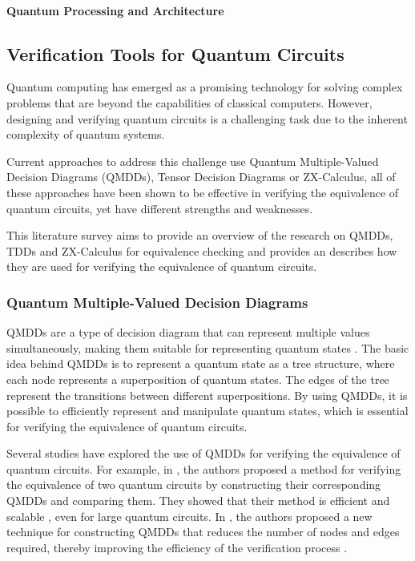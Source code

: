 \documentclass[11pt]{article}
\theoremstyle{definition}
\theoremstyle{definition}
\begin{document}
\paragraph{Quantum Processing and Architecture}
\label{sec:org3408efc}

\subsection{Verification Tools for Quantum Circuits}
\label{sec:orga91866d}
Quantum computing has emerged as a promising technology for solving complex
problems that are beyond the capabilities of classical computers. However,
designing and verifying quantum circuits is a challenging task due to the
inherent complexity of quantum systems. 

Current approaches to address this challenge use Quantum Multiple-Valued
Decision Diagrams (QMDDs), Tensor Decision Diagrams or ZX-Calculus,
all of these approaches have been shown to be effective in
verifying the equivalence of quantum circuits, yet have different strengths 
and weaknesses. 

This literature survey aims
to provide an overview of the research on QMDDs, TDDs and ZX-Calculus for
equivalence checking and provides an describes how they are used for 
verifying the equivalence of quantum circuits.

\subsubsection{Quantum Multiple-Valued Decision Diagrams}
\label{sec:org5095817}
QMDDs are a type of decision diagram that can represent multiple values
simultaneously, making them suitable for representing quantum states \cite{Miller_QMDD_2006}. The
basic idea behind QMDDs is to represent a quantum state as a tree
structure, where each node represents a superposition of quantum states.
The edges of the tree represent the transitions between different
superpositions. By using QMDDs, it is possible to efficiently represent and
manipulate quantum states, which is essential for verifying the equivalence
of quantum circuits.

 Several studies have explored the use of QMDDs for verifying the equivalence of
 quantum circuits. 
 For example, in \cite{peham_equivalence_2022}, the authors proposed a method for
 verifying the equivalence of two quantum circuits by constructing their
 corresponding QMDDs and comparing them. 
 They showed that their method is
 efficient and scalable
\cite{Niemann_QMMD_2017} \cite{zulehner_advanced_2018}\cite{zulehner_efficiently_2019} , even for large
 quantum circuits. 
 In \cite{Burgholzer_random_2021}, the
 authors proposed a new technique for constructing QMDDs that reduces the
 number of nodes and edges required, thereby improving the efficiency of the
 verification process .
\end{document}
